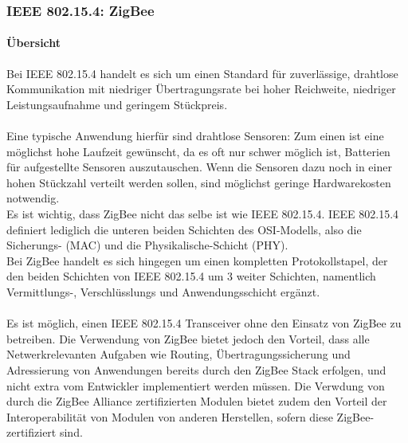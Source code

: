         \subsubsection{IEEE 802.15.4: ZigBee}

            \paragraph{Übersicht}
                Bei IEEE 802.15.4 handelt es sich um einen Standard für 
                zuverlässige, drahtlose Kommunikation mit niedriger Übertragungsrate
                bei hoher Reichweite, niedriger Leistungsaufnahme und geringem Stückpreis.\\
                \\
                Eine typische Anwendung hierfür sind drahtlose Sensoren: Zum einen
                ist eine möglichst hohe Laufzeit gewünscht, da es oft nur schwer
                möglich ist, Batterien für aufgestellte Sensoren auszutauschen.
                Wenn die Sensoren dazu noch in einer hohen Stückzahl verteilt werden
                sollen, sind möglichst geringe Hardwarekosten notwendig.
                \\
                Es ist wichtig, dass ZigBee nicht das selbe ist wie IEEE 802.15.4.
                IEEE 802.15.4 definiert lediglich die unteren beiden Schichten des
                OSI-Modells, also die Sicherungs- (MAC) und die Physikalische-Schicht 
                (PHY).\\
                Bei ZigBee handelt es sich hingegen um einen kompletten Protokollstapel,
                der den beiden Schichten von IEEE 802.15.4 um 3 weiter Schichten,
                namentlich Vermittlungs-, Verschlüsslungs und Anwendungsschicht 
                ergänzt.  \\
                \\
                Es ist möglich, einen IEEE 802.15.4 Transceiver ohne den Einsatz
                von ZigBee zu betreiben. Die Verwendung von ZigBee bietet jedoch
                den Vorteil, dass alle Netwerkrelevanten Aufgaben wie Routing,
                Übertragungssicherung und Adressierung von Anwendungen bereits
                durch den ZigBee Stack erfolgen, und nicht extra vom Entwickler
                implementiert werden müssen. Die Verwdung von durch die
                ZigBee Alliance zertifizierten Modulen bietet zudem den
                Vorteil der Interoperabilität von Modulen von anderen Herstellen,
                sofern diese ZigBee-zertifiziert sind.

